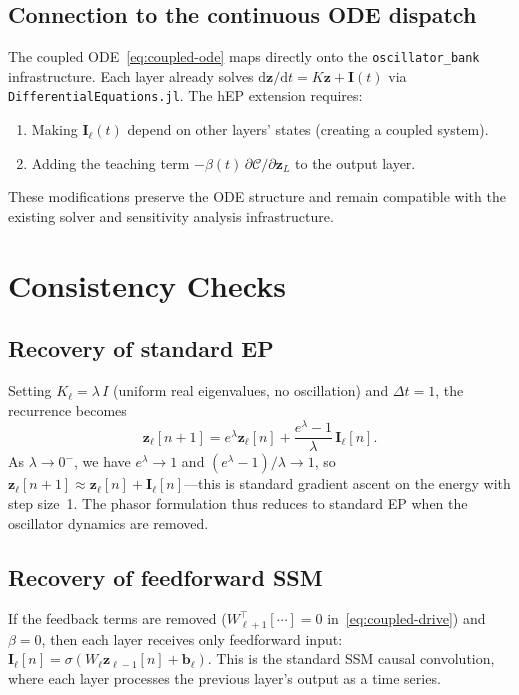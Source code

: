 \documentclass[11pt]{article}
\newcommand{\dd}{\mathrm{d}}
\newcommand{\dt}{\Delta t}
\theoremstyle{definition}
\begin{document}
\subsection{Connection to the continuous ODE dispatch}

The coupled ODE~\eqref{eq:coupled-ode} maps directly onto the
\texttt{oscillator\_bank} infrastructure.  Each layer already solves
$\dd\bm{z}/\dd t = K\bm{z} + \bm{I}(t)$ via
\texttt{DifferentialEquations.jl}.  The hEP extension requires:
\begin{enumerate}
\item Making $\bm{I}_\ell(t)$ depend on other layers' states
  (creating a coupled system).
\item Adding the teaching term
  $-\beta(t)\,\partial\mathcal{C}/\partial\bm{z}_L$ to the output
  layer.
\end{enumerate}
These modifications preserve the ODE structure and remain compatible
with the existing solver and sensitivity analysis infrastructure.

\section{Consistency Checks}\label{sec:checks}

\subsection{Recovery of standard EP}

Setting $K_\ell=\lambda\,I$ (uniform real eigenvalues, no oscillation)
and $\dt=1$, the recurrence becomes
\[
  \bm{z}_\ell[n+1]
  = e^{\lambda}\bm{z}_\ell[n]
  + \frac{e^\lambda-1}{\lambda}\,\bm{I}_\ell[n].
\]
As $\lambda\to 0^-$, we have $e^\lambda\to 1$ and
$(e^\lambda-1)/\lambda\to 1$, so
$\bm{z}_\ell[n+1]\approx\bm{z}_\ell[n]+\bm{I}_\ell[n]$---this is
standard gradient ascent on the energy with step size~1.
The phasor formulation thus reduces to standard EP when the oscillator
dynamics are removed.

\subsection{Recovery of feedforward SSM}

If the feedback terms are removed
($W_{\ell+1}^{\!\top}[\cdots]=0$ in~\eqref{eq:coupled-drive}) and
$\beta=0$, then each layer receives only feedforward input:
$\bm{I}_\ell[n]=\sigma(W_\ell\bm{z}_{\ell-1}[n]+\bm{b}_\ell)$.
This is the standard SSM causal convolution, where each layer
processes the previous layer's output as a time series.
\end{document}
